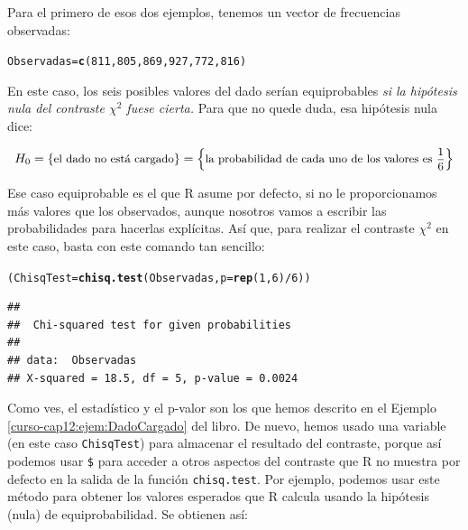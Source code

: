 \documentclass[10pt,a4paper]{article}\usepackage[]{graphicx}\usepackage[]{color}
\makeatletter
\newcommand{\hlnum}[1]{\textcolor[rgb]{0.686,0.059,0.569}{#1}}%
\newcommand{\hlopt}[1]{\textcolor[rgb]{0,0,0}{#1}}%
\newcommand{\hlstd}[1]{\textcolor[rgb]{0.345,0.345,0.345}{#1}}%
\newcommand{\hlkwb}[1]{\textcolor[rgb]{0.69,0.353,0.396}{#1}}%
\newcommand{\hlkwc}[1]{\textcolor[rgb]{0.333,0.667,0.333}{#1}}%
\newcommand{\hlkwd}[1]{\textcolor[rgb]{0.737,0.353,0.396}{\textbf{#1}}}%
\newenvironment{kframe}{%
 \def\at@end@of@kframe{}%
 \ifinner\ifhmode%
  \def\at@end@of@kframe{\end{minipage}}%
  \begin{minipage}{\columnwidth}%
 \fi\fi%
 \def\FrameCommand##1{\hskip\@totalleftmargin \hskip-\fboxsep
 \colorbox{shadecolor}{##1}\hskip-\fboxsep
     \hskip-\linewidth \hskip-\@totalleftmargin \hskip\columnwidth}%
 \MakeFramed {\advance\hsize-\width
   \@totalleftmargin\z@ \linewidth\hsize
   \@setminipage}}%
 {\par\unskip\endMakeFramed%
 \at@end@of@kframe}
\newenvironment{knitrout}{}{} %
\newcounter {cont01}
\makeatother
\begin{document}
Para el primero de esos dos ejemplos, tenemos un vector de frecuencias observadas:
\begin{knitrout}
\color{fgcolor}\begin{kframe}
\begin{alltt}
\hlstd{Observadas} \hlkwb{=} \hlkwd{c}\hlstd{(}\hlnum{811}\hlstd{,} \hlnum{805}\hlstd{,} \hlnum{869}\hlstd{,} \hlnum{927}\hlstd{,} \hlnum{772}\hlstd{,} \hlnum{816}\hlstd{)}
\end{alltt}
\end{kframe}
\end{knitrout}
En este caso, los seis posibles valores del dado serían equiprobables {\em si la hipótesis nula  del contraste $\chi^2$ fuese cierta.} Para que no quede duda, esa hipótesis nula dice:

\[H_0=\left\{\mbox{\small el dado no está cargado}\right\}=\left\{\mbox{\small la probabilidad de cada uno de los valores es $\dfrac{1}{6}$} \right\}\]

Ese caso equiprobable es el que R asume por defecto, si no le proporcionamos más valores que los observados, aunque nosotros vamos a escribir las probabilidades para hacerlas explícitas. Así que, para realizar el contraste $\chi^2$ en este caso, basta con este comando tan sencillo:

\begin{knitrout}
\color{fgcolor}\begin{kframe}
\begin{alltt}
\hlstd{(ChisqTest} \hlkwb{=} \hlkwd{chisq.test}\hlstd{(Observadas,} \hlkwc{p}\hlstd{=}\hlkwd{rep}\hlstd{(}\hlnum{1}\hlstd{,} \hlnum{6}\hlstd{)}\hlopt{/}\hlnum{6}\hlstd{))}
\end{alltt}
\begin{verbatim}
## 
## 	Chi-squared test for given probabilities
## 
## data:  Observadas
## X-squared = 18.5, df = 5, p-value = 0.0024
\end{verbatim}
\end{kframe}
\end{knitrout}

Como ves, el estadístico y el p-valor son los que hemos descrito en el Ejemplo \ref{curso-cap12:ejem:DadoCargado} del libro. De nuevo, hemos usado una variable (en este caso {\tt ChisqTest}) para almacenar el resultado del contraste, porque así podemos usar {\tt \$}
para acceder a otros aspectos del contraste que R no muestra por defecto en la salida de la  función {\tt chisq.test}. Por ejemplo, podemos usar este método para obtener los valores esperados que R calcula usando la hipótesis (nula) de equiprobabilidad. Se obtienen así:
\end{document}
